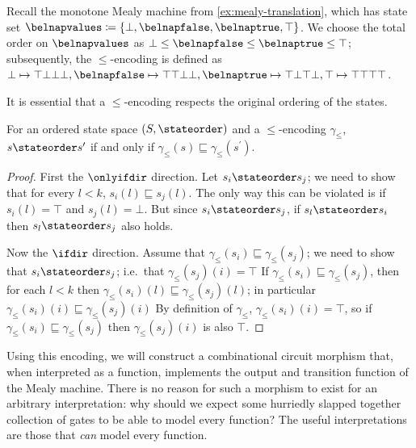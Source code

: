 \begin{example}
    Recall the monotone Mealy machine from \cref{ex:mealy-translation}, which
    has state set \(
        \belnapvalues \coloneqq \{\bot,\belnapfalse,\belnaptrue,\top\}
    \).
    We choose the total order on \(\belnapvalues\) as
    \(\bot \leq \belnapfalse \leq \belnaptrue \leq \top\); subsequently, the
    \(\leq\)-encoding is defined as \(
        \bot \mapsto \top\bot\bot\bot, \belnapfalse \mapsto \top\top\bot\bot,
        \belnaptrue \mapsto \top\bot\top\bot, \top \mapsto \top\top\top\top
    \).
\end{example}

It is essential that a \(\leq\)-encoding respects the original ordering of the
states.

\begin{lemma}
    For an ordered state space \((S,\stateorder)\) and a \(\leq\)-encoding
    \(\gamma_\leq\), \(s \stateorder s^\prime\) if and only if
    \(\gamma_\leq(s) \sqsubseteq \gamma_\leq(s^\prime)\).
\end{lemma}
\begin{proof}
    First the \(\onlyifdir\) direction.
    Let \(s_i \stateorder s_j\); we need to show that for every \(l < k\),
    \(s_i(l) \sqsubseteq s_j(l)\).
    The only way this can be violated is if \(s_i(l) = \top\) and
    \(s_j(l) = \bot\).
    But since \(s_i \stateorder s_j\), if \(s_l \stateorder s_i\) then
    \(s_l \stateorder s_j\) also holds.

    Now the \(\ifdir\) direction.
    Assume that \(\gamma_\leq(s_i) \sqsubseteq \gamma_\leq(s_j)\); we need to
    show that \(s_i \stateorder s_j\); i.e.\ that \(\gamma_\leq(s_j)(i) = \top\)
    If \(\gamma_\leq(s_i) \sqsubseteq \gamma_\leq(s_j)\), then for each
    \(l < k\) then \(\gamma_\leq(s_i)(l) \sqsubseteq \gamma_\leq(s_j)(l)\);
    in particular \(\gamma_\leq(s_i)(i) \sqsubseteq \gamma_\leq(s_j)(i)\)
    By definition of \(\gamma_\leq\), \(\gamma_\leq(s_i)(i) = \top\), so if
    \(\gamma_\leq(s_i) \sqsubseteq \gamma_\leq(s_j)\) then
    \(\gamma_\leq(s_j)(i)\) is also \(\top\).
\end{proof}

Using this encoding, we will construct a combinational circuit morphism that,
when interpreted as a function, implements the output and transition function
of the Mealy machine.
There is no reason for such a morphism to exist for an arbitrary interpretation:
why should we expect some hurriedly slapped together collection of gates to be
able to model every function?
The useful interpretations are those that \emph{can} model every function.


